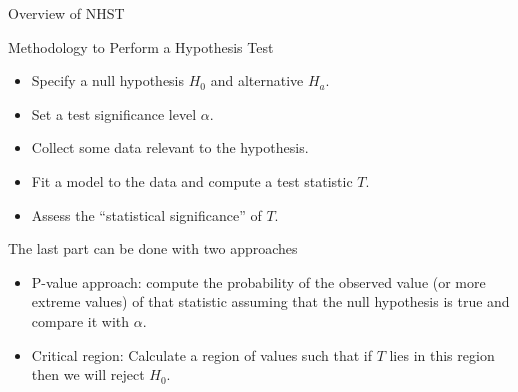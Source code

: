 \documentclass[handout]{beamer}
\begin{document}
\begin{frame}{Overview of NHST}
\scriptsize{


\begin{block}{Methodology to Perform a Hypothesis Test}
\begin{itemize}
 \item Specify a null hypothesis $H_0$ and alternative $H_a$.
 \item Set a test significance level $\alpha$.
 \item Collect some data relevant to the hypothesis.
 \item Fit a model to the data and compute a test statistic $T$.
 \item Assess the ``statistical significance'' of $T$.
\end{itemize}
\end{block}

The last part can be done with two approaches
\begin{itemize}
 \item P-value approach: compute the probability of the observed value (or more extreme values) of that statistic assuming that the null hypothesis is true and compare it with $\alpha$.

\item Critical region: Calculate a region of values such that if $T$ lies in this region then we will reject $H_0$.

\end{itemize}



} 
\end{frame}
\end{document}
